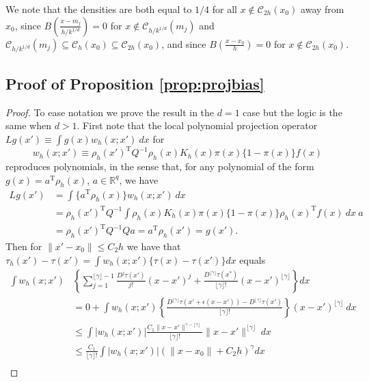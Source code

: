 \documentclass[11pt,twoside]{article}
\def\T{{ \mathrm{\scriptscriptstyle T} }}
\newcommand{\R}{\mathbb{R}}
\theoremstyle{definition}
\theoremstyle{remark}
\begin{document}
 \bigskip
 
We note that the densities are both equal to $1/4$ for all $x \notin \mathcal{C}_{2h}(x_0)$ away from $x_0$, since $B \left( \frac{x-m_j}{h/k^{1/d}}  \right)=0$ for $x \notin \mathcal{C}_{h/k^{1/d}}(m_j)$ and $\mathcal{C}_{h/k^{1/d}}(m_j) \subseteq \mathcal{C}_h(x_0) \subseteq \mathcal{C}_{2h}(x_0)$, and since $B\left( \frac{x-x_0}{h} \right)=0$ for $x \notin \mathcal{C}_{2h}(x_0)$. \\

\subsection{Proof of Proposition \ref{prop:projbias}}
\label{app:projbias}

\begin{proof}
To ease notation we prove the result in the $d=1$ case but the logic is the same when $d>1$. First note that the local polynomial projection operator $Lg(x') \equiv \int g(x) w_h(x;x') \ dx$ for 
$$ w_h(x;x') \equiv \rho_h(x')^\T Q^{-1} \rho_h(x) K_h(x) \pi(x) \{1-\pi(x)\} f(x) $$
reproduces polynomials, in the sense that, for any polynomial of the form $g(x) = a^\T \rho_h(x)$, $a \in \R^q$, we have
\begin{align*}
Lg(x') &= \int \Big\{ a^\T \rho_h(x) \Big\} w_{h}(x;x') \ dx  \\
&=  \rho_h(x')^\T Q^{-1} \int \rho_h(x)  K_{h}(x) \pi(x) \{1-\pi(x)\} \rho_h(x)^\T f(x) \ dx \ a  \\
&= \rho_h(x')^\T Q^{-1} Q a = a^\T \rho_h(x') = g(x') .
\end{align*}
Then for $\|x'-x_0\| \leq C_2h$ we have that $\tau_h(x')-\tau(x')=\int w_h(x;x') \Big\{ \tau(x)  - \tau(x') \Big\} dx$ equals
\begin{align}
 \int w_h(x;x') &\left\{ \sum_{j=1}^{\lfloor \gamma \rfloor -1} \frac{D^j \tau(x')}{j!} (x-x')^j + \frac{D^{\lfloor \gamma \rfloor} \tau(x^*)}{\lfloor \gamma \rfloor!} (x-x')^{\lfloor \gamma \rfloor} \right\} dx \nonumber \\
&= 0 + \int w_h(x;x')  \left\{ \frac{D^{\lfloor \gamma \rfloor}\tau(x' + \epsilon(x-x'))-D^{\lfloor \gamma \rfloor}\tau(x')}{{\lfloor \gamma \rfloor}!} \right\} (x-x')^{\lfloor \gamma \rfloor} \ dx \nonumber \\
&\leq \int  \left| w_h(x;x') \right| \frac{C_1  \|x-x'\|^{\gamma-{\lfloor \gamma \rfloor}}}{{\lfloor \gamma \rfloor}!} \|x-x'\|^{{\lfloor \gamma \rfloor} } \ dx \nonumber \\
&\leq \frac{C_1}{{\lfloor \gamma \rfloor}!} \int  \left| w_h(x;x') \right| \left( \| x- x_0 \| + C_2 h \right)^\gamma dx \nonumber \\

\end{align}
\end{proof}
\end{document}
